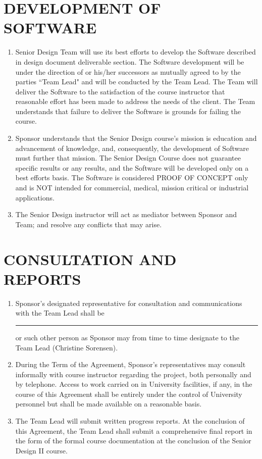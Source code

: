 \documentclass[11pt]{article}
\begin{document}
\section{DEVELOPMENT OF SOFTWARE }
\begin{enumerate}  \itemsep4pt \parskip0pt 
\item  Senior Design Team will use its best efforts to develop the Software described in design document deliverable section. The Software development will be under the direction of  or his/her successors as mutually agreed to by the parties ``Team Lead" and will be conducted by the Team Lead.  The Team will deliver the Software to the satisfaction of the course instructor that reasonable effort has been made to address the needs of the client.  The Team understands that failure to deliver the Software is grounds for failing the course. 

\item  Sponsor understands that the Senior Design course's mission is education and advancement of knowledge, and, consequently, the development of Software must further that mission. The Senior Design Course does not guarantee specific results or any results, and the Software will be developed only on a best efforts basis.  The Software is considered PROOF OF CONCEPT only and is NOT intended for commercial, medical, mission critical or industrial applications.

\item  The Senior Design instructor will act as mediator between Sponsor and Team; and resolve any conflicts that may arise.
\end{enumerate}

\section{CONSULTATION AND REPORTS}     
\begin{enumerate}  \itemsep4pt \parskip0pt 
\item  Sponsor's designated representative for consultation and       communications with the Team Lead shall be \\[3mm]  \rule{7cm}{0.4pt}    or such other person as Sponsor       may from time to time designate to the Team Lead (Christine Sorensen).    

\item During the Term of the Agreement, Sponsor's representatives may       consult informally with course instructor regarding the       project, both personally and by telephone. Access to work carried       on in University facilities, if any, in the course of this Agreement shall       be entirely under the control of University personnel but shall be       made available on a reasonable basis.    

\item The Team Lead will submit written progress reports. At the conclusion of this Agreement, the Team Lead shall submit a comprehensive final report in the form of the formal course documentation at the conclusion of the Senior Design II course. 
\end{enumerate}
\end{document}
